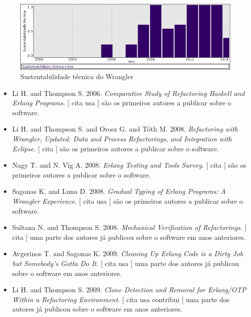 \begin{figure}[h]
  \center
  \includegraphics[scale=0.50]{imagens/softwares-charts/wrangler.png}
  \caption{Sustentabilidade técnica do Wrangler}
\end{figure}


\begin{itemize}
\item Li H. and Thompson S.
      2006.
        \textit{ Comparative Study of Refactoring Haskell and Erlang Programs}.
      [
          cita
          usa
      ]
são os primeiros autores a publicar sobre o software.
\item Li H. and Thompson S. and Orosz G. and T\'{o}th M.
      2008.
        \textit{ Refactoring with Wrangler, Updated: Data and Process Refactorings, and Integration with Eclipse}.
      [
          cita
      ]
são os primeiros autores a publicar sobre o software.
\item Nagy T. and N. V\'{\i}g A.
      2008.
        \textit{ Erlang Testing and Tools Survey}.
      [
          cita
      ]
são os primeiros autores a publicar sobre o software.
\item Sagonas K. and Luna D.
      2008.
        \textit{ Gradual Typing of Erlang Programs: A Wrangler Experience}.
      [
          cita
          usa
      ]
são os primeiros autores a publicar sobre o software.
\item Sultana N. and Thompson S.
      2008.
        \textit{ Mechanical Verification of Refactorings}.
      [
          cita
      ]
uma parte dos autores já publicou sobre o software em anos anteriores.
\item Avgerinos T. and Sagonas K.
      2009.
        \textit{ Cleaning Up Erlang Code is a Dirty Job but Somebody's Gotta Do It}.
      [
          cita
          usa
      ]
uma parte dos autores já publicou sobre o software em anos anteriores.
\item Li H. and Thompson S.
      2009.
        \textit{ Clone Detection and Removal for Erlang/OTP Within a Refactoring Environment}.
      [
          cita
          usa
          contribui
      ]
uma parte dos autores já publicou sobre o software em anos anteriores.

\end{itemize}
